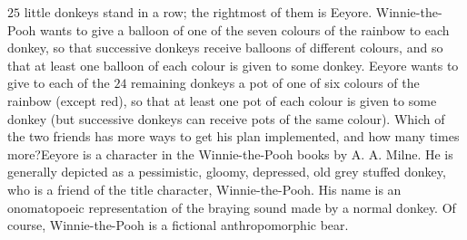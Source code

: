 $25$ little donkeys stand in a row; the rightmost of them is Eeyore. Winnie-the-Pooh wants to give a balloon of one of the seven colours of the rainbow to each donkey, so that successive donkeys receive balloons of different colours, and so that at least one balloon of each colour is given to some donkey. Eeyore wants to give to each of the $24$ remaining donkeys a pot of one of six colours of the rainbow (except red), so that at least one pot of each colour is given to some donkey (but successive donkeys can receive pots of the same colour). Which of the two friends has more ways to get his plan implemented, and how many times more?Eeyore is a character in the Winnie-the-Pooh books by A. A. Milne. He is generally depicted as a pessimistic, gloomy, depressed, old grey stuffed donkey, who is a friend of the title character, Winnie-the-Pooh. His name is an onomatopoeic representation of the braying sound made by a normal donkey. Of course, Winnie-the-Pooh is a fictional anthropomorphic bear.
